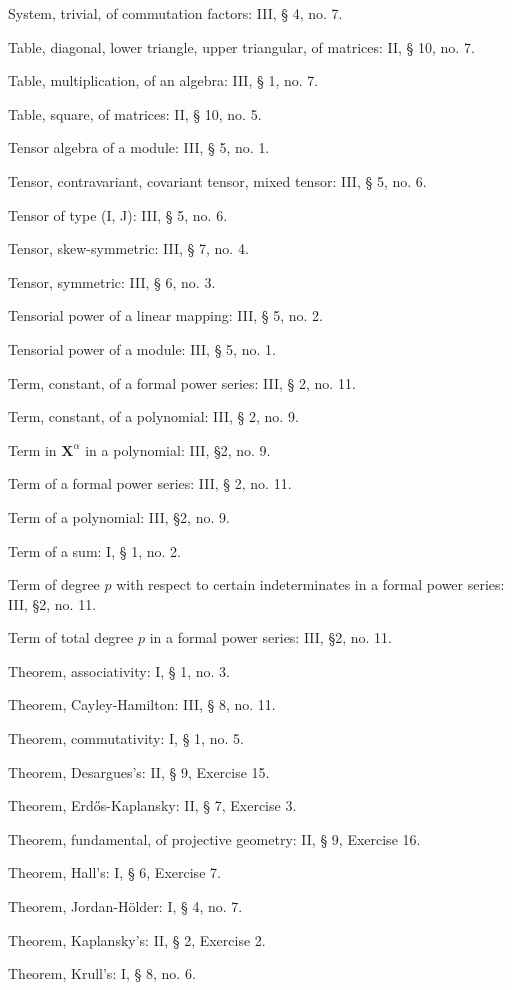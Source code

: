 System, trivial, of commutation factors: III, § 4, no. 7.

Table, diagonal, lower triangle, upper triangular, of matrices: II, § 10, no. 7.

Table, multiplication, of an algebra: III, § 1, no. 7.

Table, square, of matrices: II, § 10, no. 5.

Tensor algebra of a module: III, § 5, no. 1.

Tensor, contravariant, covariant tensor, mixed tensor: III, § 5, no. 6.

Tensor of type (I, J): III, § 5, no. 6.

Tensor, skew-symmetric: III, § 7, no. 4.

Tensor, symmetric: III, § 6, no. 3.

Tensorial power of a linear mapping: III, § 5, no. 2.

Tensorial power of a module: III, § 5, no. 1.

Term, constant, of a formal power series: III, § 2, no. 11.

Term, constant, of a polynomial: III, § 2, no. 9.

Term in \(\mathbf{X}^{\alpha}\) in a polynomial: III, §2, no. 9.

Term of a formal power series: III, § 2, no. 11.

Term of a polynomial: III, §2, no. 9.

Term of a sum: I, § 1, no. 2.

Term of degree \(p\) with respect to certain indeterminates in a formal power series: III, §2, no. 11.

Term of total degree \(p\) in a formal power series: III, §2, no. 11.

Theorem, associativity: I, § 1, no. 3.

Theorem, Cayley-Hamilton: III, § 8, no. 11.

Theorem, commutativity: I, § 1, no. 5.

Theorem, Desargues's: II, § 9, Exercise 15.

Theorem, Erdős-Kaplansky: II, § 7, Exercise 3.

Theorem, fundamental, of projective geometry: II, § 9, Exercise 16.

Theorem, Hall's: I, § 6, Exercise 7.

Theorem, Jordan-Hölder: I, § 4, no. 7.

Theorem, Kaplansky's: II, § 2, Exercise 2.

Theorem, Krull's: I, § 8, no. 6.

